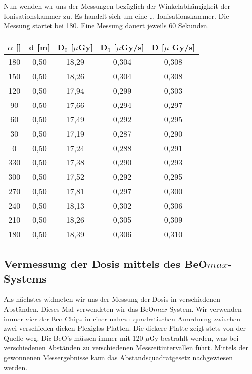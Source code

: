 Nun wenden wir uns der Messungen bezüglich der Winkelabhängigkeit der Ionisationskammer zu. Es handelt sich um eine ... Ionisationskammer. Die Messung startet bei 180\textdegree. Eine Messung dauert jeweils 60 Sekunden.

	\begin{center}
		\begin{tabular}{c|c|c|c|c}
				\textbf{$\alpha$} [\textdegree] & \textbf{d} [m] & \textbf{D$_0$} [$\mu$Gy] & \textbf{\.D$_0$} [$\mu$Gy/s] & \textbf{\.D} [$\mu$ Gy/s] \\ 
		\hline	180 & 0,50 & 18,29 & 0,304 & 0,308 \\ 
				150 & 0,50 & 18,26 & 0,304 & 0,308 \\ 
				120 & 0,50 & 17,94 & 0,299 & 0,303 \\ 
				90  & 0,50 & 17,66 & 0,294 & 0,297 \\ 
				60  & 0,50 & 17,49 & 0,292 & 0,295 \\ 
				30  & 0,50 & 17,19 & 0,287 & 0,290 \\ 
				0   & 0,50 & 17,24 & 0,288 & 0,291 \\ 
				330 & 0,50 & 17,38 & 0,290 & 0,293 \\ 
				300 & 0,50 & 17,52 & 0,292 & 0,295 \\ 
				270 & 0,50 & 17,81 & 0,297 & 0,300 \\ 
				240 & 0,50 & 18,13 & 0,302 & 0,306 \\ 
			    210 & 0,50 & 18,26 & 0,305 & 0,309 \\ 
		\hline	180 & 0,50 & 18,39 & 0,306 & 0,310 \\ 
		\end{tabular} 
	\end{center}
				

\subsection{Vermessung der Dosis mittels des BeO$max$-Systems}

Als nächstes widmeten wir uns der Messung der Dosis in verschiedenen Abständen. Dieses Mal verwendeten wir das BeO$max$-System. Wir verwenden immer vier der Beo-Chips in einer nahezu quadratischen Anordnung zwischen zwei verschieden dicken Plexiglas-Platten. Die dickere Platte zeigt stets von der Quelle weg.
Die BeO's müssen immer mit 120 $\mu$Gy bestrahlt werden, was bei verschiedenen Abständen zu verschiedenen Messzeitintervallen führt. Mittels der gewonnenen Messergebnisse kann das Abstandsquadratgesetz nachgewiesen werden. 

